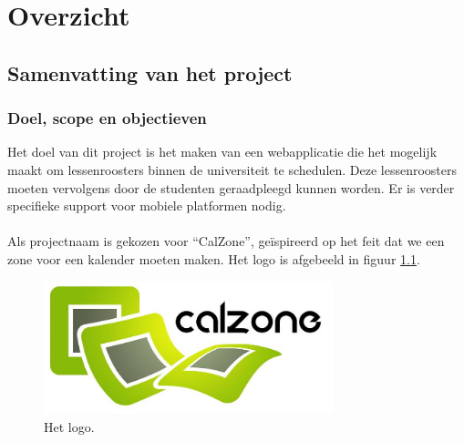 \chapter{Overzicht}
\section{Samenvatting van het project}
\subsection{Doel, scope en objectieven}
Het doel van dit project is het maken van een webapplicatie die het mogelijk maakt om lessenroosters binnen de universiteit te schedulen. Deze lessenroosters moeten vervolgens door de studenten geraadpleegd kunnen worden. Er is verder specifieke support voor mobiele platformen nodig. 
\\
\\
Als projectnaam is gekozen voor ``CalZone'', ge\"{i}spireerd op het feit dat we een zone voor een kalender moeten maken. Het logo is afgebeeld in figuur \ref{fig:logoProject}.
\begin{figure} [H]
    \centering
    \includegraphics[width = 0.75\textwidth]{Overview/logo_Green_Crop.jpg}
    \caption{Het logo.}
    \label{fig:logoProject}
\end{figure}

